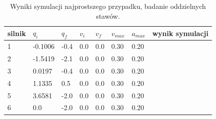 \documentclass[a4paper, 12pt]{article}
\begin{document}
	\begin{table}[H]
	\centering
	\begin{tabular}{|m{2.5em}|m{4em}|m{4em}|m{4em}|m{4em}|m{4em}|m{4em}|m{5em}|}
	\hline
	silnik&$ q_i $ & $ q_f $ & $ v_i $ & $ v_f $ & $ v_{max} $ & $ a_{max} $&wynik symulacji\\
	\hline
	\hline
	\hspace{1em}1& -0.1006 & -0.4 & 0.0 & 0.0 & 0.30 & 0.20&\hspace{2em}\checkmark\\ %
	\hline
	\hspace{1em}2& -1.5419 & -2.1 & 0.0 & 0.0 & 0.30 & 0.20&\hspace{2em}\checkmark\\  %
	\hline
	\hspace{1em}3& 0.0197 & -0.4 & 0.0 & 0.0 & 0.30 & 0.20&\hspace{2em}\checkmark\\ %
	\hline
	\hspace{1em}4& 1.1335 & 0.5 & 0.0 & 0.0 & 0.30 & 0.20&\hspace{2em}\checkmark\\  %
	\hline
	\hspace{1em}5& 3.6581 & -2.0 & 0.0 & 0.0 & 0.30 & 0.20&\hspace{2em}\checkmark\\  %
	\hline
	\hspace{1em}6& 0.0 & -2.0 & 0.0 & 0.0 & 0.30 & 0.20&\hspace{2em}\checkmark\\  %
	\hline
	\end{tabular}
	\caption{Wyniki symulacji najprostszego przypadku, badanie oddzielnych stawów.}
	\label{tab:simpJPVrevers}
	\end{table}
	
\end{document}
